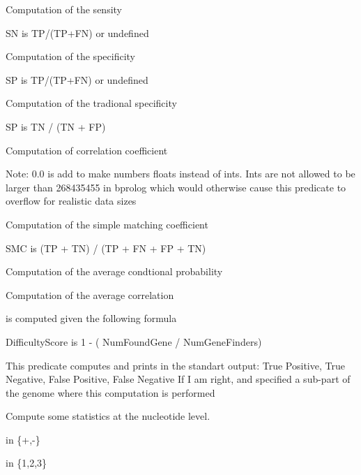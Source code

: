 \begin{description}
Computation of the sensity

\begin{code}
SN is TP/(TP+FN) or undefined
\end{code}

Computation of the specificity

\begin{code}
SP is TP/(TP+FN) or undefined
\end{code}

Computation of the tradional specificity

\begin{code}
SP is TN / (TN + FP)
\end{code}

Computation of correlation coefficient

Note: 0.0 is add to make numbers floats instead of ints.
Ints are not allowed to be larger than 268435455 in bprolog which
would otherwise cause this predicate to overflow for realistic data sizes

Computation of the simple matching coefficient

\begin{code}
SMC is (TP + TN) / (TP + FN + FP + TN)
\end{code}

Computation of the average condtional probability

Computation of the average correlation

 is computed given the following formula

\begin{code}
DifficultyScore is 1 - ( NumFoundGene / NumGeneFinders)
\end{code}

This predicate computes and prints in the standart output: True Positive,
True Negative, False Positive, False Negative
If I am right,  and  specified a sub-part of the genome where this
computation is performed

Compute some statistics at the nucleotide level.

 in \{+,-\}

 in \{1,2,3\}
\end{description}


